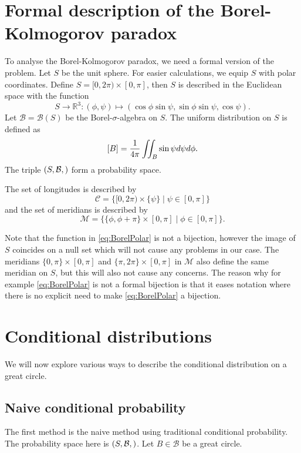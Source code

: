 \documentclass[twoside,a4paper]{report}
\theoremstyle{plain}
\theoremstyle{definition}
\theoremstyle{remark}
\numberwithin{equation}{chapter}
\newcommand{\R}{\mathbb{R}}
\let\P\relax
\DeclareMathOperator{\P}{\mathbb{P}}
\DeclareMathOperator{\1}{\mathbbm{1}}
\newcommand{\B}{\mathcal{B}}
\begin{document}
\section{Formal description of the Borel-Kolmogorov paradox}
To analyse the Borel-Kolmogorov paradox, we need a formal version of the problem. Let $S$ be the unit sphere. For easier calculations, we equip $S$ with polar coordinates. Define $S=[0,2\pi)\times[0,\pi]$, then $S$ is described in the Euclidean space with the function
\begin{equation}\label{eq:BorelPolar}
S\to\R^3:(\phi,\psi)\mapsto(\cos\phi\sin\psi,\sin\phi\sin\psi,\cos\psi).
\end{equation}
Let $\B=\B(S)$ be the Borel-$\sigma$-algebra on $S$. The uniform distribution on $S$ is defined as
\begin{equation}
\P[B]=\frac{1}{4\pi}\iint_B\sin\psi d\psi d\phi.
\end{equation}
The triple $(S,\B,\P)$ form a probability space.

The set of longitudes is described by 
\begin{equation}
\mathcal{C}=\{[0,2\pi)\times\{\psi\}\mid\psi\in[0,\pi]\}
\end{equation}
and the set of meridians is described by
\begin{equation}
\mathcal{M}=\{\{\phi,\phi+\pi\}\times[0,\pi]\mid\phi\in[0,\pi]\}.
\end{equation}

Note that the function in \eqref{eq:BorelPolar} is not a bijection, however the image of $S$ coincides on a null set which will not cause any problems in our case. The meridians $\{0,\pi\}\times[0,\pi]$ and $\{\pi,2\pi\}\times[0,\pi]$ in $\mathcal{M}$ also define the same meridian on $S$, but this will also not cause any concerns. The reason why for example \eqref{eq:BorelPolar} is not a formal bijection is that it eases notation where there is no explicit need to make \eqref{eq:BorelPolar} a bijection.

\section{Conditional distributions}
We will now explore various ways to describe the conditional distribution on a great circle.
\subsection{Naive conditional probability}\label{sec:BorelNaive}
The first method is the naive method using traditional conditional probability. The probability space here is $(S,\B,\P)$. Let $B\in\B$ be a great circle.
\end{document}
